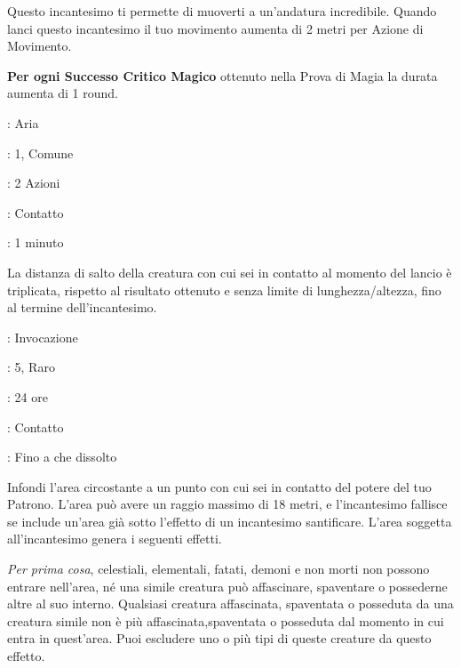 \begin{multicols}{2}
Questo incantesimo ti permette di muoverti a un'andatura incredibile. Quando lanci questo incantesimo il tuo movimento aumenta di 2 metri per Azione di Movimento.

\textbf{Per ogni Successo Critico Magico} ottenuto nella Prova di Magia la durata aumenta di 1 round.

\noindent\colorbox{OBSSgold!10}{
\begin{minipage}{0.95\linewidth}
\begin{description}[noitemsep, topsep=0pt, parsep=0pt, partopsep=0pt, leftmargin=0cm, labelwidth=1.3cm]
	\item[\textbf{Lista}]: Aria
	\item[\textbf{Livello}]: 1, Comune
	\item[\textbf{Lancio}]: 2 Azioni
	\item[\textbf{Gittata}]: Contatto
	\item[\textbf{Durata}]: 1 minuto
\end{description}
\end{minipage}}\smallskip

La distanza di salto della creatura con cui sei in contatto al momento del lancio è triplicata, rispetto al risultato ottenuto e senza limite di lunghezza/altezza, fino al termine dell'incantesimo.

\noindent\colorbox{OBSSgold!10}{
\begin{minipage}{0.95\linewidth}
\begin{description}[noitemsep, topsep=0pt, parsep=0pt, partopsep=0pt, leftmargin=0cm, labelwidth=1.3cm]
	\item[\textbf{Lista}]: Invocazione
	\item[\textbf{Livello}]: 5, Raro
	\item[\textbf{Lancio}]: 24 ore
	\item[\textbf{Gittata}]: Contatto
	\item[\textbf{Durata}]: Fino a che dissolto
\end{description}
\end{minipage}}\smallskip

Infondi l'area circostante a un punto con cui sei in contatto del potere del tuo Patrono. L'area può avere un raggio massimo di 18 metri, e l'incantesimo fallisce se include un'area già sotto l'effetto di un incantesimo santificare. L'area soggetta all'incantesimo genera i seguenti effetti.

\emph{Per prima cosa}, celestiali, elementali, fatati, demoni e non morti non possono entrare nell'area, né una simile creatura può affascinare, spaventare o possederne altre al suo interno. Qualsiasi creatura affascinata, spaventata o posseduta da una creatura simile non è più affascinata,spaventata o posseduta dal momento in cui entra in quest'area. Puoi escludere uno o più tipi di queste creature da questo effetto.


\end{multicols}
